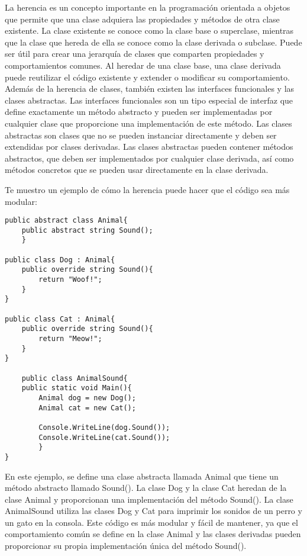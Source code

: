 \documentclass[executivepaper]{article}
\begin{document}
La herencia es un concepto importante en la programación orientada a objetos que permite que una clase adquiera las propiedades y métodos de otra clase existente. La clase existente se conoce como la clase base o superclase, mientras que la clase que hereda de ella se conoce como la clase derivada o subclase. Puede ser útil para crear una jerarquía de clases que comparten propiedades y comportamientos comunes. Al heredar de una clase base, una clase derivada puede reutilizar el código existente y extender o modificar su comportamiento. Además de la herencia de clases, también existen las interfaces funcionales y las clases abstractas. Las interfaces funcionales son un tipo especial de interfaz que define exactamente un método abstracto y pueden ser implementadas por cualquier clase que proporcione una implementación de este método. Las clases abstractas son clases que no se pueden instanciar directamente y deben ser extendidas por clases derivadas. Las clases abstractas pueden contener métodos abstractos, que deben ser implementados por cualquier clase derivada, así como métodos concretos que se pueden usar directamente en la clase derivada.

Te muestro un ejemplo de cómo la herencia puede hacer que el código sea más modular:

\begin{lstlisting}
public abstract class Animal{
    public abstract string Sound();
    }

public class Dog : Animal{
    public override string Sound(){
        return "Woof!";
    }
}

public class Cat : Animal{
    public override string Sound(){
        return "Meow!";
    }
}

    public class AnimalSound{
    public static void Main(){
        Animal dog = new Dog();
        Animal cat = new Cat();

        Console.WriteLine(dog.Sound());
        Console.WriteLine(cat.Sound());
        }
}
\end{lstlisting}

En este ejemplo, se define una clase abstracta llamada Animal que tiene un método abstracto llamado Sound(). La clase Dog y la clase Cat heredan de la clase Animal y proporcionan una implementación del método Sound(). La clase AnimalSound utiliza las clases Dog y Cat para imprimir los sonidos de un perro y un gato en la consola. Este código es más modular y fácil de mantener, ya que el comportamiento común se define en la clase Animal y las clases derivadas pueden proporcionar su propia implementación única del método Sound().
\end{document}

